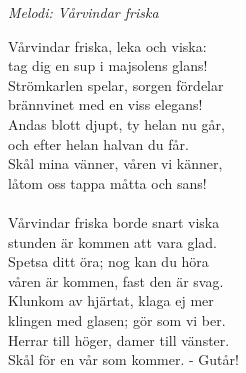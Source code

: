 {\footnotesize\textit{Melodi: Vårvindar friska}}\par
\vspace{10pt}
Vårvindar friska, leka och viska:\\
tag dig en sup i majsolens glans!\\
Strömkarlen spelar, sorgen fördelar\\
brännvinet med en viss elegans!\\
Andas blott djupt, ty helan nu går,\\
och efter helan halvan du får.\\
Skål mina vänner, våren vi känner,\\
låtom oss tappa måtta och sans! \\
\\
Vårvindar friska borde snart viska\\
stunden är kommen att vara glad.\\
Spetsa ditt öra; nog kan du höra\\
våren är kommen, fast den är svag.\\
Klunkom av hjärtat, klaga ej mer\\
klingen med glasen; gör som vi ber.\\
Herrar till höger, damer till vänster.\\
Skål för en vår som kommer. - Gutår!
